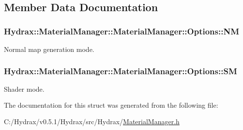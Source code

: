 \subsection{Member Data Documentation}
\hypertarget{struct_hydrax_1_1_material_manager_1_1_options_e1c30e8d6b99933136f76904537aa758}{
\subsubsection[{NM}]{ Hydrax::MaterialManager::MaterialManager::Options::NM}}
\label{struct_hydrax_1_1_material_manager_1_1_options_e1c30e8d6b99933136f76904537aa758}


Normal map generation mode. 

\hypertarget{struct_hydrax_1_1_material_manager_1_1_options_4159e967b01acfb23b1f7103aacfd735}{
\subsubsection[{SM}]{ Hydrax::MaterialManager::MaterialManager::Options::SM}}
\label{struct_hydrax_1_1_material_manager_1_1_options_4159e967b01acfb23b1f7103aacfd735}


Shader mode. 



The documentation for this struct was generated from the following file:\begin{CompactItemize}
\item 
C:/Hydrax/v0.5.1/Hydrax/src/Hydrax/\hyperlink{_material_manager_8h}{MaterialManager.h}\end{CompactItemize}
